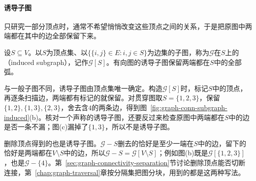 \paragraph{诱导子图}
只研究一部分顶点时，通常不希望悄悄改变这些顶点之间的关系，于是把原图中两端都在其中的边全部保留下来。

\begin{definition}[诱导子图]
\label{def:graph-conn-induced-subgraph}
设$S\subseteq V$。以$S$为顶点集、以$\{\{i,j\}\in E:i,j\in S\}$为边集的子图，称为$\mathcal G$在$S$上的（induced subgraph），记作$\mathcal G[S]$。有向图的诱导子图保留两端都在$S$中的全部弧。
\end{definition}

与一般子图不同，诱导子图由顶点集唯一确定。构造$\mathcal G[S]$时，标记$S$中的顶点，再逐条扫描边，两端都有标记的就保留。对贯穿图取$S=\{1,2,3\}$，保留$\{1,2\},\{1,3\},\{2,3\}$，舍去含$4$的两条边，得到图~\ref{fig:graph-conn-subgraph-induced}(b)。核对一个声称的诱导子图，还要反过来检查原图中两端都在$S$中的边是否一条不漏；图(c)漏掉了$\{1,3\}$，所以不是诱导子图。

删除顶点得到的也是诱导子图。$\mathcal G-S$删去的恰好是至少一端在$S$中的边，留下的恰好是两端都在$V\setminus S$中的边，所以$\mathcal G-S=\mathcal G[V\setminus S]$；例如图(b)既是$\mathcal G[\{1,2,3\}]$，也是$\mathcal G-\{4\}$。第~\ref{sec:graph-connectivity-separation}节讨论删除顶点能否切断连接，第~\ref{chap:graph-traversal}章按分隔集把图分块，用到的都是这两种写法。
